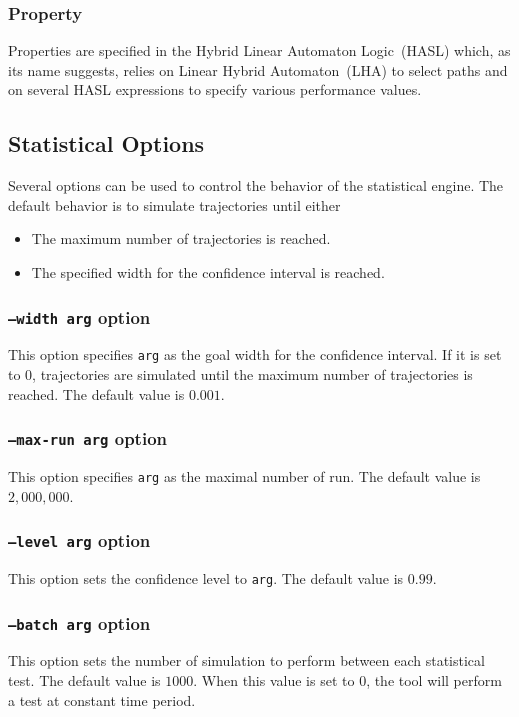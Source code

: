\documentclass{article}
\begin{document}
\subsubsection{Property}
Properties are specified in the Hybrid Linear Automaton Logic~(HASL)
which, as its name suggests, relies on Linear Hybrid Automaton~(LHA) to
select paths and on several HASL expressions to specify various
performance values.


\subsection{Statistical Options}
Several options can be used to control the behavior of the statistical engine.
The default behavior is to simulate trajectories until either
\begin{itemize}
\item The maximum number of trajectories is reached.
\item The specified width for the confidence interval is reached.
\end{itemize}

\subsubsection{\texttt{--width arg}  option}
This option specifies \texttt{arg} as the goal width for the
confidence interval. If it is set to $0$, trajectories are simulated
until the maximum number of trajectories is reached.  The default
value is $0.001$.

\subsubsection{\texttt{--max-run arg}  option}
This option specifies \texttt{arg} as the maximal number of run.
The default value is $2,000,000$.

\subsubsection{\texttt{--level arg}  option}
This option sets the confidence level to \texttt{arg}.
The default value is $0.99$.

\subsubsection{\texttt{--batch arg}  option}
This option sets the number of simulation to perform between each
statistical test.  The default value is $1000$. When this value is 
set to $0$, the tool will perform a test at constant time period.
\end{document}
